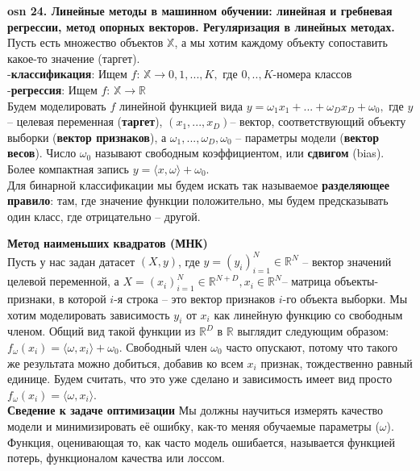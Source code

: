\setcounter{section}{15}
\setcounter{subsection}{24}
\setcounter{equation}{0}
\textbf{\LARGE osn 24. Линейные методы в машинном обучении: линейная и гребневая регрессии, метод опорных векторов. Регуляризация в линейных методах. }  \\
Пусть есть множество объектов $\mathbb{X}$, а мы хотим каждому объекту сопоставить какое-то значение (таргет). \\
-\textbf{классификация}: Ищем $f$: $\mathbb{X} \xrightarrow{}0,1,...,K,$ где $0,..,K$-номера классов \\
-\textbf{регрессия}:  Ищем $f$: $\mathbb{X} \xrightarrow{} \mathbb{R}$ \\
Будем моделировать $f$ линейной функцией вида $ y = \omega_1x_1+...+\omega_Dx_D+\omega_0,$ где $y$ – целевая переменная (\textbf{таргет}), $(x_1,...,x_D)$– вектор, соответствующий объекту выборки (\textbf{вектор признаков}), а $\omega_1,...,\omega_D,\omega_0$ – параметры модели (\textbf{вектор весов}). Число $\omega_0$ называют свободным коэффициентом, или \textbf{сдвигом} (bias). Более компактная запись $y = \langle{x, \omega}\rangle+\omega_0$. \\
Для бинарной классификации мы будем искать так называемое \textbf{разделяющее правило}: там, где значение функции положительно, мы будем предсказывать один класс, где отрицательно – другой.

\textbf{Метод наименьших квадратов (МНК)} \\
Пусть у нас задан датасет $(X, y)$, где 
$y=(y_i)_{i=1}^N \in \mathbb{R}^{N}$ – вектор значений целевой переменной, а $X=(x_i)_{i=1}^N \in \mathbb{R}^{N+D}, x_i \in \mathbb{R}^{N}$– матрица объекты-признаки, в которой 
$i$-я строка – это вектор признаков 
$i$-го объекта выборки. Мы хотим моделировать зависимость $y_i$ от $x_i$ как линейную функцию со свободным членом. Общий вид такой функции из $\mathbb{R}^D$ в $\mathbb{R}$ выглядит следующим образом: $ f_{\omega}(x_i)=\langle\omega,x_i\rangle+\omega_0$.
Свободный член $\omega_0$ часто опускают, потому что такого же результата можно добиться, добавив ко всем $x_i$ признак, тождественно равный единице. Будем считать, что это уже сделано и зависимость имеет вид просто $f_\omega(x_i)=\langle\omega,x_i\rangle$. \\
\textbf{Сведение к задаче оптимизации} Мы должны научиться измерять качество модели и минимизировать её ошибку, как-то меняя обучаемые параметры ($\omega$). Функция, оценивающая то, как часто модель ошибается, называется функцией потерь, функционалом качества или лоссом.

